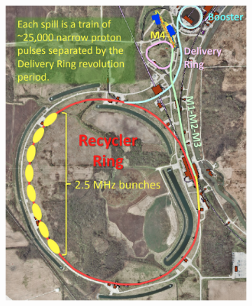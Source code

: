 \begin{figure}[!h]
     \begin{subfigure}[b]{0.4\linewidth}
         \centering
         \includegraphics[scale = 0.3]{images/chapter2/Screenshot_20240301_151449.png}
         \label{fig:accell}
     \end{subfigure}
     \begin{subfigure}[b]{0.7\linewidth}
         \centering

\end{subfigure}
\end{figure}
